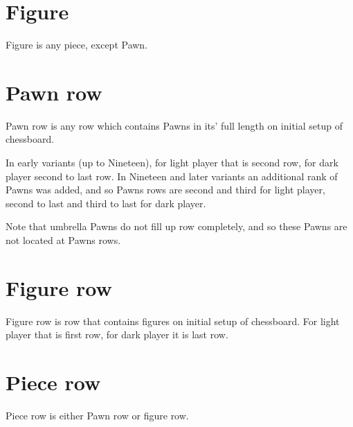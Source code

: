 \section*{Figure}
\label{sec:Terms/Figure}
Figure is any piece, except Pawn.

\section*{Pawn row}
\label{sec:Terms/Pawn row}
Pawn row is any row which contains Pawns in its' full length on initial setup
of chessboard.

In early variants (up to Nineteen), for light player that is second row, for
dark player second to last row. In Nineteen and later variants an additional
rank of Pawns was added, and so Pawns rows are second and third for light
player, second to last and third to last for dark player.

Note that umbrella Pawns do not fill up row completely, and so these Pawns are
not located at Pawns rows.

\section*{Figure row}
\label{sec:Terms/Figure row}
Figure row is row that contains figures on initial setup of chessboard.
For light player that is first row, for dark player it is last row.

\section*{Piece row}
\label{sec:Terms/Piece row}
Piece row is either Pawn row or figure row.

\clearpage %
